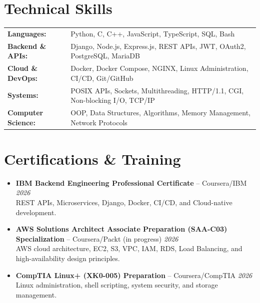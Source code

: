 \documentclass[9.5pt, a4paper]{article}
\begin{document}
\section{Technical Skills}
{\small
\begin{tabularx}{\linewidth}{@{}>{\bfseries}p{3.5cm} X@{}}
  Languages:        & Python, C, C++, JavaScript, TypeScript, SQL, Bash \\[1pt]
  Backend \& APIs:  & Django, Node.js, Express.js, REST APIs, JWT, OAuth2, PostgreSQL, MariaDB \\[1pt]
  Cloud \& DevOps:  & Docker, Docker Compose, NGINX, Linux Administration, CI/CD, Git/GitHub \\[1pt]
  Systems:          & POSIX APIs, Sockets, Multithreading, HTTP/1.1, CGI, Non-blocking I/O, TCP/IP \\[1pt]
  Computer Science: & OOP, Data Structures, Algorithms, Memory Management, Network Protocols \\
\end{tabularx}
}

\section{Certifications \& Training}
{\small
\begin{itemize}
  \item \textbf{IBM Backend Engineering Professional Certificate} -- Coursera/IBM \hfill \textit{2026}\\
  REST APIs, Microservices, Django, Docker, CI/CD, and Cloud-native development.

  \item \textbf{AWS Solutions Architect Associate Preparation (SAA-C03) Specialization} -- Coursera/Packt (in progress) \hfill \textit{2026}\\
  AWS cloud architecture, EC2, S3, VPC, IAM, RDS, Load Balancing, and high-availability design principles.

  \item \textbf{CompTIA Linux+ (XK0-005) Preparation} -- Coursera/CompTIA \hfill \textit{2026}\\
  Linux administration, shell scripting, system security, and storage management.
\end{itemize}
}

\end{document}

